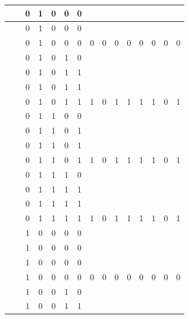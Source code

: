 \begin{table}[!tb]
\begin{tabular}{|c|c|c|c|c|c|c|c|c|c|c|c|c|c|c|}
        \rowcolor{yellow!40}  &  & 0 & 1 & 0 & 0 & 0 &  &  &  &  &  &  &  &  \\ \hline
        \rowcolor{yellow!40}  &  & 0 & 1 & 0 & 0 & 0 &  &  &  &  &  &  &  &  \\ \hline
        \rowcolor{yellow!40}  &  & 0 & 1 & 0 & 0 & 0 & 0 & 0 & 0 & 0 & 0 & 0 & 0 & 0 \\ \hline
        \rowcolor{gray!40}  &  & 0 & 1 & 0 & 1 & 0 &  &  &  &  &  &  &  &  \\ \hline
        \rowcolor{gray!40}  &  & 0 & 1 & 0 & 1 & 1 &  &  &  &  &  &  &  &  \\ \hline
        \rowcolor{gray!40}  &  & 0 & 1 & 0 & 1 & 1 &  &  &  &  &  &  &  &  \\ \hline
        \rowcolor{gray!40}  &  & 0 & 1 & 0 & 1 & 1 & 1 & 0 & 1 & 1 & 1 & 1 & 0 & 1 \\ \hline
        \rowcolor{blue!40}  &  & 0 & 1 & 1 & 0 & 0 &  &  &  &  &  &  &  &  \\ \hline
        \rowcolor{blue!40}  &  & 0 & 1 & 1 & 0 & 1 &  &  &  &  &  &  &  &  \\ \hline
        \rowcolor{blue!40}  &  & 0 & 1 & 1 & 0 & 1 &  &  &  &  &  &  &  &  \\ \hline
        \rowcolor{blue!40}  &  & 0 & 1 & 1 & 0 & 1 & 1 & 0 & 1 & 1 & 1 & 1 & 0 & 1 \\ \hline
        \rowcolor{red!40}  &  & 0 & 1 & 1 & 1 & 0 &  &  &  &  &  &  &  &  \\ \hline
        \rowcolor{red!40}  &  & 0 & 1 & 1 & 1 & 1 &  &  &  &  &  &  &  &  \\ \hline
        \rowcolor{red!40}  &  & 0 & 1 & 1 & 1 & 1 &  &  &  &  &  &  &  &  \\ \hline
        \rowcolor{red!40}  &  & 0 & 1 & 1 & 1 & 1 & 1 & 0 & 1 & 1 & 1 & 1 & 0 & 1 \\ \hline
        \rowcolor{green!40}  &  & 1 & 0 & 0 & 0 & 0 &  &  &  &  &  &  &  &  \\ \hline
        \rowcolor{green!40}  &  & 1 & 0 & 0 & 0 & 0 &  &  &  &  &  &  &  &  \\ \hline
        \rowcolor{green!40}  &  & 1 & 0 & 0 & 0 & 0 &  &  &  &  &  &  &  &  \\ \hline
        \rowcolor{green!40}  &  & 1 & 0 & 0 & 0 & 0 & 0 & 0 & 0 & 0 & 0 & 0 & 0 & 0 \\ \hline
        \rowcolor{yellow!40}  &  & 1 & 0 & 0 & 1 & 0 &  &  &  &  &  &  &  &  \\ \hline
        \rowcolor{yellow!40}  &  & 1 & 0 & 0 & 1 & 1 &  &  &  &  &  &  &  &  \\ \hline

\end{tabular}
\end{table}
